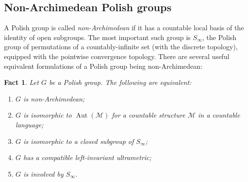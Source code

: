 \documentclass[12pt]{amsart}
\theoremstyle{plain}
\newtheorem{fact}[theorem]{Fact}
\theoremstyle{definition}
\newcommand{\isom}{\cong}
\newcommand{\mcL}{\mathcal{L}}
\newcommand{\mcM}{\mathcal{M}}
\newcommand{\mcN}{\mathcal{N}}
\DeclareMathOperator{\Aut}{Aut}
\begin{document}

\subsection{Non-Archimedean Polish groups}

A Polish group is called \emph{non-Archimedean} if it has a countable local basis of the identity of open subgroups.
The most important such group is $S_\infty$, the Polish group of permutations of a countably-infinite set (with the discrete topology), equipped with the pointwise convergence topology.
There are several useful equivalent formulations of a Polish group being non-Archimedean:

\begin{fact}\label{fact:nonarchimedean}
Let $G$ be a Polish group. The following are equivalent:
\begin{enumerate}
    \item $G$ is non-Archimedean;
    \item $G$ is isomorphic to $\Aut(\mcM)$ for a countable structure $\mcM$ in a countable language;
    \item $G$ is isomorphic to a closed subgroup of $S_\infty$;
    \item $G$ has a compatible left-invariant ultrametric;
    \item $G$ is involved by $S_\infty$.
\end{enumerate}
\end{fact}
\end{document}

